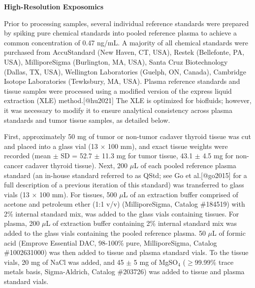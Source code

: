 \newpage


\vspace{0.5em}

\noindent\textbf{High-Resolution Exposomics}

Prior to processing samples, several individual reference standards were prepared by spiking pure chemical standards into pooled reference plasma to achieve a common concentration of 0.47 ng/mL. A majority of all chemical standards were purchased from AccuStandard (New Haven, CT, USA), Restek (Bellefonte, PA, USA), MilliporeSigma (Burlington, MA, USA), Santa Cruz Biotechnology (Dallas, TX, USA), Wellington Laboratories (Guelph, ON, Canada), Cambridge Isotope Laboratories (Tewksbury, MA, USA). Plasma reference standards and tissue samples were processed using a modified version of the express liquid extraction (XLE) method.[@hu2021] The XLE is optimized for biofluids; however, it was necessary to modify it to ensure analytical consistency across plasma standards and tumor tissue samples, as detailed below.

First, approximately 50 mg of tumor or non-tumor cadaver thyroid tissue was cut and placed into a glass vial (13 $\times$ 100 mm), and exact tissue weights were recorded (mean $\pm$ SD = 52.7 $\pm$ 11.3 mg for tumor tissue, 43.1 $\pm$ 4.5 mg for non-cancer cadaver thyroid tissue). Next, 200 $\mu$L of each pooled reference plasma standard (an in-house standard referred to as QStd; see Go et al.[@go2015] for a full description of a previous iteration of this standard) was transferred to glass vials (13 $\times$ 100 mm). For tissues, 500 $\mu$L of an extraction buffer comprised of acetone and petroleum ether (1:1 v/v) (MilliporeSigma, Catalog \#184519) with 2\% internal standard mix, was added to the glass vials containing tissues. For plasma, 200 $\mu$L of extraction buffer containing 2\% internal standard mix was added to the glass vials containing the pooled reference plasma. 50 $\mu$L of formic acid (Emprove\textregistered{} Essential DAC, 98-100\% pure, MilliporeSigma, Catalog \#1002631000) was then added to tissue and plasma standard vials. To the tissue vials, 20 mg of NaCl was added, and 45 $\pm$ 5 mg of MgSO$_4$ ($\geq$99.99\% trace metals basis, Sigma-Aldrich, Catalog \#203726) was added to tissue and plasma standard vials.

